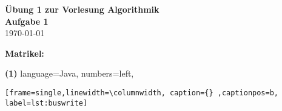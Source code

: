 \documentclass[letterpaper,11pt]{article}
\def\ds{\displaystyle}
\begin{document}

\begin{center} {\large \textbf{Übung 1 zur Vorlesung Algorithmik}}\\
{\large \textbf{Aufgabe 1}}\\
\today


\end{center}

{ \textbf{Matrikel:} \underline{\hspace{1cm}} 



\bigskip


\bigskip
\bigskip

\noindent \textbf{(1)}
\lstset
{ 
    language=Java,
    numbers=left,
}

\begin{lstlisting}[frame=single,linewidth=\columnwidth, caption={} ,captionpos=b, label=lst:buswrite] 

\end{lstlisting}

\vspace{.5cm}

















\newpage








}
\end{document}
